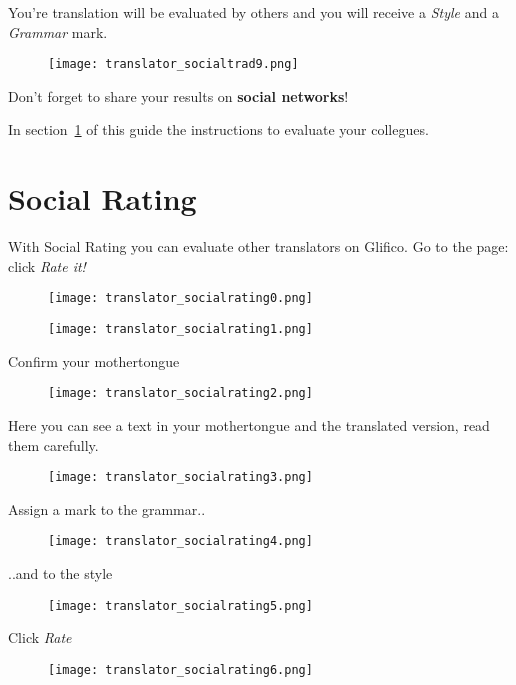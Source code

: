 \documentclass[11 pt, a4paper]{article}
\begin{document}
You're translation will be evaluated by others and you will receive a \textit{Style} and a \textit{Grammar} mark.
\begin{figure}[H]
\centering
\texttt{[image: translator\_socialtrad9.png]}
\end{figure}

Don't forget to share your results on \textbf{social networks}!

In section~\ref{sec:socialrating} of this guide the instructions to evaluate your collegues.

\clearpage
\section{Social Rating}
\label{sec:socialrating}

With Social Rating you can evaluate other translators on Glifico. Go to the page: click \textit{Rate it!}
\begin{figure}[H]
\centering
\texttt{[image: translator\_socialrating0.png]}
\end{figure}


\begin{figure}[H]
\centering
\texttt{[image: translator\_socialrating1.png]}
\end{figure}


\clearpage
Confirm your mothertongue
\begin{figure}[H]
\centering
\texttt{[image: translator\_socialrating2.png]}
\end{figure}

Here you can see a text in your mothertongue and the translated version, read them carefully.
\begin{figure}[H]
\centering
\texttt{[image: translator\_socialrating3.png]}
\end{figure}


\clearpage
Assign a mark to the grammar..
\begin{figure}[H]
\centering
\texttt{[image: translator\_socialrating4.png]}
\end{figure}

..and to the style
\begin{figure}[H]
\centering
\texttt{[image: translator\_socialrating5.png]}
\end{figure}


\clearpage
Click \textit{Rate}
\begin{figure}[H]
\centering
\texttt{[image: translator\_socialrating6.png]}
\end{figure}
\end{document}

